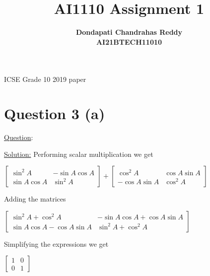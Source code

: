 \documentclass{article}
\begin{document}
\title{\textbf{AI1110 Assignment 1} }
\author{\textbf{Dondapati Chandrahas Reddy}\\\textbf{AI21BTECH11010}}
\maketitle
\begin{center}
{\Large ICSE Grade 10 2019 paper
}\end{center}\par
{\Large 

\section{Question 3 (a) }
}{\Large \underline{Question}:}


\begin{center}
\setlength \fboxrule {0in}
\setlength \fboxsep {0.1in}
\end{center}\par
{\Large \underline{Solution:}\newline\newline}
Performing scalar multiplication we get 


\begin{center}
$\left [\begin{array}{cc}\sin ^{2} A &  -\sin  A \cos  A \\
\sin  A \cos  A & \sin ^{2} A\end{array}\right ] +\left [\begin{array}{cc}\cos ^{2} A & \cos  A \sin  A \\
 -\cos  A \sin  A & \cos ^{2} A\end{array}\right ]$\newline
\end{center}\par
Adding the matrices 


\begin{center}
$\left [\begin{array}{cc}\sin ^{2} A +\cos ^{2} A &  -\sin  A \cos  A +\cos  A \sin  A \\
\sin  A \cos  A -\cos  A \sin  A & \sin ^{2} A +\cos ^{2} A\end{array}\right ]$\linebreak\relax
\end{center}\par
Simplifying the expressions we get



\begin{center}
$\left [\begin{array}{cc}1 & 0 \\
0 & 1\end{array}\right ]$
\end{center}\par
\end{document}
